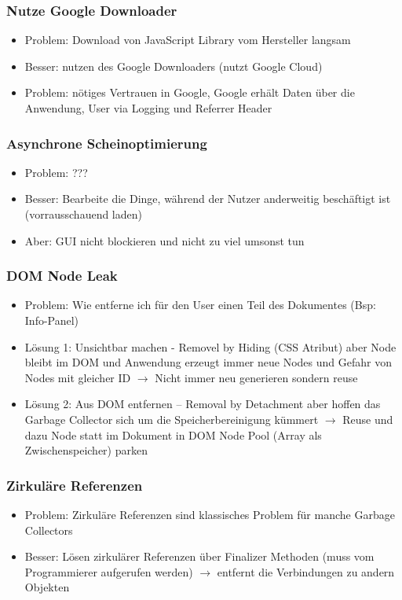 \documentclass{article} %
\begin{document}
	\subsubsection{Nutze Google Downloader}
	\begin{itemize}
		\item Problem: Download von JavaScript Library vom Hersteller langsam
		\item Besser: nutzen des Google Downloaders (nutzt Google Cloud)
		\item Problem: nötiges Vertrauen in Google, Google erhält Daten über die Anwendung, User via Logging und Referrer Header
	\end{itemize}
	\subsubsection{Asynchrone Scheinoptimierung}
	\begin{itemize}
		\item Problem: ???
		\item Besser: Bearbeite die Dinge, während der Nutzer anderweitig beschäftigt ist (vorrausschauend laden)
		\item Aber: GUI nicht blockieren und nicht zu viel umsonst tun
	\end{itemize}
	\subsubsection{DOM Node Leak}
	\begin{itemize}
		\item Problem: Wie entferne ich für den User einen Teil des Dokumentes (Bsp: Info-Panel)
		\item Lösung 1: Unsichtbar machen - Removel by Hiding (CSS Atribut) aber Node bleibt im DOM und Anwendung erzeugt immer neue Nodes und Gefahr von Nodes mit gleicher ID $\rightarrow$ Nicht immer neu generieren sondern reuse
		\item Lösung 2: Aus DOM entfernen – Removal by Detachment aber hoffen das Garbage Collector sich um die Speicherbereinigung kümmert $\rightarrow$ Reuse und dazu Node statt im Dokument in DOM Node Pool (Array als Zwischenspeicher) parken
	\end{itemize}
	\subsubsection{Zirkuläre Referenzen}
	\begin{itemize}
		\item Problem: Zirkuläre Referenzen sind klassisches Problem für manche Garbage Collectors
		\item Besser: Lösen zirkulärer Referenzen über Finalizer Methoden (muss vom Programmierer aufgerufen werden) $\rightarrow$ entfernt die Verbindungen zu andern Objekten
	\end{itemize}
\end{document}
